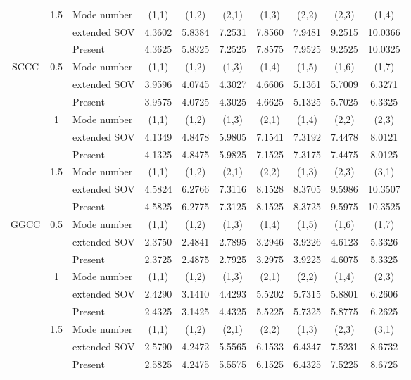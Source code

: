 \documentclass[preprint,12pt]{elsarticle}
\begin{document}
\begin{table}[!htbp]
\begin{tabular}{c c l c c c c c c c}
		& 1.5 & Mode number   & (1,1) & (1,2) & (2,1) & (1,3) & (2,2) & (2,3) & (1,4) \\
		&     & extended SOV \Citealp{xing2020extended}   & 4.3602 & 5.8384 & 7.2531 & 7.8560 & 7.9481 & 9.2515 & 10.0366 \\
		&     & Present       & 4.3625 & 5.8325 & 7.2525 & 7.8575 & 7.9525 & 9.2525 & 10.0325 \\
		SCCC & 0.5 & Mode number & (1,1) & (1,2) & (1,3) & (1,4) & (1,5) & (1,6) & (1,7) \\
		&     & extended SOV \Citealp{xing2020extended}   & 3.9596 & 4.0745 & 4.3027 & 4.6606 & 5.1361 & 5.7009 & 6.3271 \\
		&     & Present       & 3.9575 & 4.0725 & 4.3025 & 4.6625 & 5.1325 & 5.7025 & 6.3325 \\
		& 1   & Mode number  & (1,1) & (1,2) & (1,3) & (2,1) & (1,4) & (2,2) & (2,3) \\
		&     & extended SOV \Citealp{xing2020extended}   & 4.1349 & 4.8478 & 5.9805 & 7.1541 & 7.3192 & 7.4478 & 8.0121 \\
		&     & Present       & 4.1325 & 4.8475 & 5.9825 & 7.1525 & 7.3175 & 7.4475 & 8.0125 \\
		& 1.5 & Mode number  & (1,1) & (1,2) & (2,1) & (2,2) & (1,3) & (2,3) & (3,1) \\
		&     &extended SOV \Citealp{xing2020extended}  & 4.5824 & 6.2766 & 7.3116 & 8.1528 & 8.3705 & 9.5986 & 10.3507 \\
		&     & Present       & 4.5825 & 6.2775 & 7.3125 & 8.1525 & 8.3725 & 9.5975 & 10.3525 \\
		GGCC & 0.5 & Mode number  & (1,1) & (1,2) & (1,3) & (1,4) & (1,5) & (1,6) & (1,7) \\
		&     & extended SOV \Citealp{xing2020extended}   & 2.3750 & 2.4841 & 2.7895 & 3.2946 & 3.9226 & 4.6123 & 5.3326 \\
		&     & Present       & 2.3725 & 2.4875 & 2.7925 & 3.2975 & 3.9225 & 4.6075 & 5.3325 \\
		& 1   & Mode number  & (1,1) & (1,2) & (1,3) & (2,1) & (2,2) & (1,4) & (2,3) \\
		&     & extended SOV \Citealp{xing2020extended}   & 2.4290 & 3.1410 & 4.4293 & 5.5202 & 5.7315 & 5.8801 & 6.2606 \\
		&     & Present       & 2.4325 & 3.1425 & 4.4325 & 5.5225 & 5.7325 & 5.8775 & 6.2625 \\
		& 1.5 & Mode number  & (1,1) & (1,2) & (2,1) & (2,2) & (1,3) & (2,3) & (3,1) \\
		&     & extended SOV \Citealp{xing2020extended}   & 2.5790 & 4.2472 & 5.5565 & 6.1533 & 6.4347 & 7.5231 & 8.6732 \\
		&     & Present       & 2.5825 & 4.2475 & 5.5575 & 6.1525 & 6.4325 & 7.5225 & 8.6725 \\
		\bottomrule
	\end{tabular}
	\label{tab:sov2}
\end{table}
\end{document}

